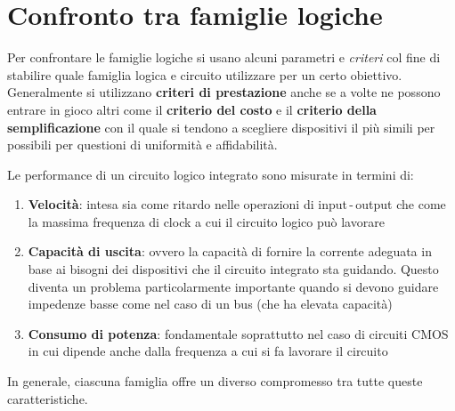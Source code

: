 \documentclass[12pt, a4paper]{report}
\begin{document}
\section{Confronto tra famiglie logiche}
Per confrontare le famiglie logiche si usano alcuni parametri e \textit{criteri} col fine di stabilire quale famiglia logica e circuito utilizzare per un certo obiettivo. Generalmente si utilizzano \textbf{criteri di prestazione} anche se a volte ne possono entrare in gioco altri come il \textbf{criterio del costo} e il \textbf{criterio della semplificazione} con il quale si tendono a scegliere dispositivi il più simili per possibili per questioni di uniformità e affidabilità.

Le performance di un circuito logico integrato sono misurate in termini di:
\begin{enumerate}
    \item\textbf{Velocità}: intesa sia come ritardo nelle operazioni di input\,-\,output che come la massima frequenza di clock a cui il circuito logico può lavorare
    \item\textbf{Capacità di uscita}: ovvero la capacità di fornire la corrente adeguata in base ai bisogni dei dispositivi che il circuito integrato sta guidando. Questo diventa un problema particolarmente importante quando si devono guidare impedenze basse come nel caso di un bus (che ha elevata capacità)
    \item\textbf{Consumo di potenza}: fondamentale soprattutto nel caso di circuiti CMOS in cui dipende anche dalla frequenza a cui si fa lavorare il circuito
\end{enumerate}
In generale, ciascuna famiglia offre un diverso compromesso tra tutte queste caratteristiche.
\end{document}
